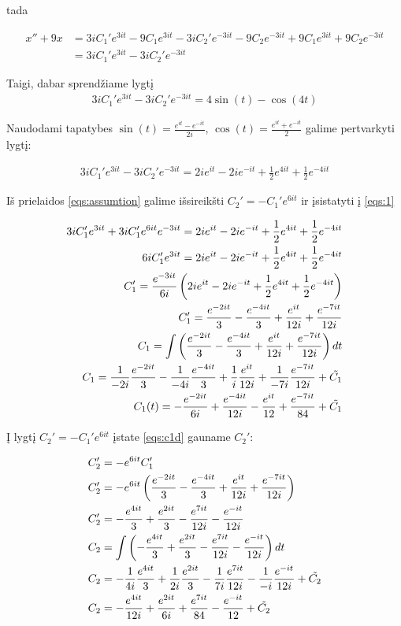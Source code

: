 \documentclass[11pt]{article}
\begin{document}
tada

\begin{align*}
x''+9x&=3iC_1'e^{3it}-9C_1e^{3it}-3iC_2'e^{-3it}-9C_2e^{-3it}+9C_1e^{3it}+9C_2e^{-3it}\\
&=3iC_1'e^{3it}-3iC_2'e^{-3it}
\end{align*}

Taigi, dabar sprendžiame lygtį
\begin{align*}
3iC_1'e^{3it}-3iC_2'e^{-3it}=4\sin(t)-\cos(4t)
\end{align*}

Naudodami tapatybes $\sin(t)=\frac{e^{it}-e^{-it}}{2i}$, $\cos(t)=\frac{e^{it}+e^{-it}}{2}$ galime pertvarkyti lygtį:

\begin{align}
3iC_1'e^{3it}-3iC_2'e^{-3it}=2ie^{it}-2ie^{-it}+\frac{1}{2}e^{4it}+\frac{1}{2}e^{-4it} \label{eqs:1}
\end{align}

Iš prielaidos \eqref{eqs:assumtion} galime išsireikšti $C_2'=-C_1'e^{6it}$ ir įsistatyti į \eqref{eqs:1}

\begin{align}
3iC_1'e^{3it}+3iC_1'e^{6it}e^{-3it}=2ie^{it}-2ie^{-it}+\frac{1}{2}e^{4it}+\frac{1}{2}e^{-4it} \notag\\
6iC_1'e^{3it}=2ie^{it}-2ie^{-it}+\frac{1}{2}e^{4it}+\frac{1}{2}e^{-4it} \notag\\
C_1'=\frac{e^{-3it}}{6i}\left(2ie^{it}-2ie^{-it}+\frac{1}{2}e^{4it}+\frac{1}{2}e^{-4it}\right) \notag\\
C_1'=\frac{e^{-2it}}{3}-\frac{e^{-4it}}{3}+\frac{e^{it}}{12i}+\frac{e^{-7it}}{12i} \label{eqs:c1d}\\
C_1=\int\left(\frac{e^{-2it}}{3}-\frac{e^{-4it}}{3}+\frac{e^{it}}{12i}+\frac{e^{-7it}}{12i}\right)dt \notag\\
C_1=\frac{1}{-2i}\frac{e^{-2it}}{3}-\frac{1}{-4i}\frac{e^{-4it}}{3}+\frac{1}{i}\frac{e^{it}}{12i}+\frac{1}{-7i}\frac{e^{-7it}}{12i}+\tilde{C_1}\notag\\
C_1(t)=-\frac{e^{-2it}}{6i}+\frac{e^{-4it}}{12i}-\frac{e^{it}}{12}+\frac{e^{-7it}}{84}+\tilde{C_1} \label{eqs:c1}
\end{align}

Į lygtį $C_2'=-C_1'e^{6it}$ įstate \eqref{eqs:c1d} gauname $C_2'$:

\begin{align}
C_2'&=-e^{6it}C_1'\notag\\
C_2'&=-e^{6it}\left(\frac{e^{-2it}}{3}-\frac{e^{-4it}}{3}+\frac{e^{it}}{12i}+\frac{e^{-7it}}{12i}\right)\notag\\
C_2'&=-\frac{e^{4it}}{3}+\frac{e^{2it}}{3}-\frac{e^{7it}}{12i}-\frac{e^{-it}}{12i}\\
C_2&=\int\left(-\frac{e^{4it}}{3}+\frac{e^{2it}}{3}-\frac{e^{7it}}{12i}-\frac{e^{-it}}{12i}\right)dt\notag\\
C_2&=-\frac{1}{4i}\frac{e^{4it}}{3}+\frac{1}{2i}\frac{e^{2it}}{3}-\frac{1}{7i}\frac{e^{7it}}{12i}-\frac{1}{-i}\frac{e^{-it}}{12i}+\tilde{C_2}\notag\\
C_2&=-\frac{e^{4it}}{12i}+\frac{e^{2it}}{6i}+\frac{e^{7it}}{84}-\frac{e^{-it}}{12}+\tilde{C_2}
\end{align}
\end{document}
